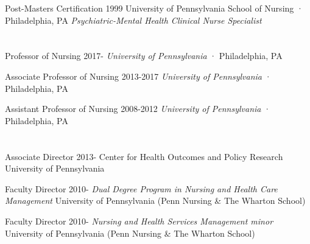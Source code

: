 \documentclass[10pt,]{article}
\begin{document}
{{{{{Post-Masters Certification \hfill 1999 \newline
University of Pennsylvania School of Nursing · Philadelphia, PA  \newline
\hspace*{0.5cm} {\textit {Psychiatric-Mental Health Clinical Nurse Specialist}} \newline

\section{\Large {}}

Professor of Nursing \hfill {2017-{\small{}}} \newline
\hspace*{0.5cm} {\textit {University of Pennsylvania}} · Philadelphia, PA

Associate Professor of Nursing \hfill 2013-2017 \newline
\hspace*{0.5cm} {\textit {University of Pennsylvania}} · Philadelphia, PA

Assistant Professor of Nursing \hfill 2008-2012 \newline
\hspace*{0.5cm} {\textit {University of Pennsylvania}} · Philadelphia, PA \newline

\section{\Large {}}

Associate Director  \hfill {2013-{\small{}}} \newline
\hspace*{0.5cm} Center for Health Outcomes and Policy Research \newline
\hspace*{0.5cm} University of Pennsylvania

Faculty Director  \hfill {2010-{\small{}}} \newline
\hspace*{0.5cm} {\textit {Dual Degree Program in Nursing and Health Care Management}} \newline
\hspace*{0.5cm} University of Pennsylvania (Penn Nursing \& The Wharton School)

Faculty Director  \hfill {2010-{\small{}}} \newline
\hspace*{0.5cm} {\textit {Nursing and Health Services Management minor}} \newline
\hspace*{0.5cm} University of Pennsylvania (Penn Nursing \& The Wharton School) \newline

}}}}}
\end{document}
